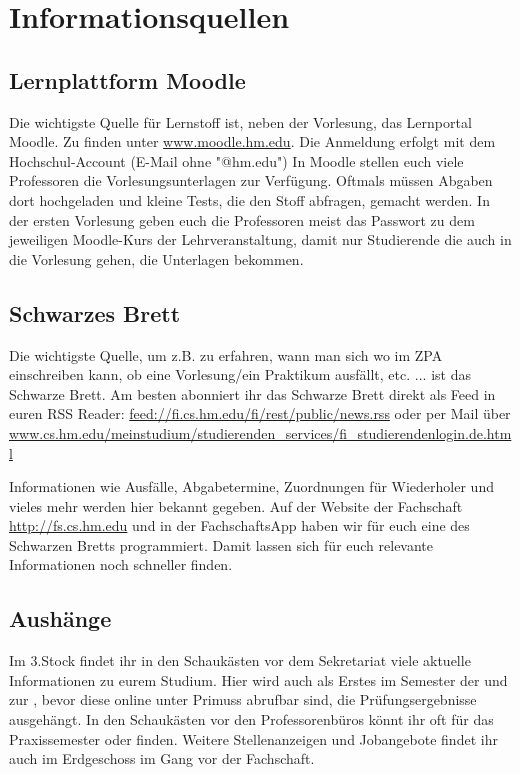 \section{Informationsquellen}

\subsection{Lernplattform Moodle}
Die wichtigste Quelle für Lernstoff ist, neben der Vorlesung, das Lernportal Moodle. Zu finden unter \url{www.moodle.hm.edu}.
Die Anmeldung erfolgt mit dem Hochschul-Account (E-Mail ohne "@hm.edu")\doublebreak
In Moodle stellen euch viele Professoren die Vorlesungsunterlagen zur Verfügung. Oftmals müssen Abgaben dort hochgeladen und kleine Tests, die den Stoff abfragen, gemacht werden.
In der ersten Vorlesung geben euch die Professoren meist das Passwort zu dem jeweiligen Moodle-Kurs der Lehrveranstaltung, damit nur Studierende die auch in die Vorlesung gehen, die Unterlagen bekommen.

\subsection{Schwarzes Brett}
Die wichtigste Quelle, um z.B. zu erfahren, wann man sich wo im ZPA einschreiben kann, ob eine Vorlesung/ein Praktikum ausfällt, etc. ... ist das Schwarze Brett.\doublebreak 
Am besten abonniert ihr das Schwarze Brett direkt als Feed in euren RSS Reader: \url{feed://fi.cs.hm.edu/fi/rest/public/news.rss} oder per Mail über \url{www.cs.hm.edu/meinstudium/studierenden\_services/fi\_studierendenlogin.de.html} 

Informationen wie Ausfälle, Abgabetermine, Zuordnungen für Wiederholer und vieles mehr werden hier bekannt gegeben.
Auf der Website der Fachschaft \url{http://fs.cs.hm.edu} und in der FachschaftsApp haben wir für euch eine  des Schwarzen Bretts
programmiert. Damit lassen sich für euch relevante Informationen noch schneller finden.

\subsection{Aushänge}
Im 3.Stock findet ihr in den Schaukästen vor dem Sekretariat viele 
aktuelle Informationen zu eurem Studium. Hier wird auch als Erstes im 
Semester der  und zur , bevor diese 
online unter Primuss abrufbar sind, die Prüfungsergebnisse ausgehängt. In den
Schaukästen vor den Professorenbüros könnt ihr oft  
für das Praxissemester oder  finden. 
Weitere Stellenanzeigen und Jobangebote findet ihr auch im 
Erdgeschoss im Gang vor der Fachschaft. 

